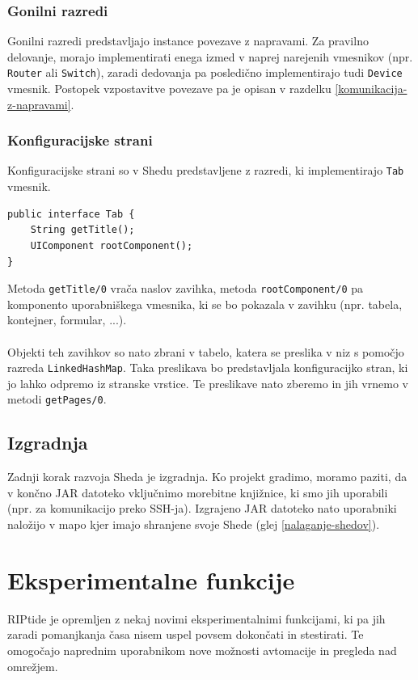 \documentclass[12pt]{article}
\begin{document}
\subsubsection{Gonilni razredi}
Gonilni razredi predstavljajo instance povezave z napravami. Za pravilno
delovanje, morajo implementirati enega izmed v naprej narejenih vmesnikov
(npr. \texttt{Router} ali \texttt{Switch}), zaradi dedovanja pa posledično
implementirajo tudi \texttt{Device} vmesnik. Postopek vzpostavitve povezave
pa je opisan v razdelku \ref{komunikacija-z-napravami}.

\subsubsection{Konfiguracijske strani} \label{konfiguracijske-strani}
Konfiguracijske strani so v Shedu predstavljene z razredi, ki
implementirajo \texttt{Tab} vmesnik.

\begin{lstlisting}[style=JavaStyle]
public interface Tab {
	String getTitle();
	UIComponent rootComponent();
}
\end{lstlisting}
Metoda \texttt{getTitle/0} vrača naslov zavihka, metoda
\texttt{rootComponent/0} pa komponento uporabniškega vmesnika, ki se bo
pokazala v zavihku (npr. tabela, kontejner, formular, ...).
\\\\
Objekti teh zavihkov so nato zbrani v tabelo, katera se preslika v niz s
pomočjo razreda \texttt{LinkedHashMap}. Taka preslikava bo predstavljala
konfiguracijko stran, ki jo lahko odpremo iz stranske vrstice. Te
preslikave nato zberemo in jih vrnemo v metodi \texttt{getPages/0}.

\subsection{Izgradnja}
Zadnji korak razvoja Sheda je izgradnja. Ko projekt gradimo, moramo paziti,
da v končno JAR datoteko vključnimo morebitne knjižnice, ki smo jih
uporabili (npr. za komunikacijo preko SSH-ja). Izgrajeno JAR datoteko nato
uporabniki naložijo v mapo kjer imajo shranjene svoje Shede
(glej \ref{nalaganje-shedov}).
\newpage

\section{Eksperimentalne funkcije}
RIPtide je opremljen z nekaj novimi eksperimentalnimi funkcijami,
ki pa jih zaradi pomanjkanja časa nisem uspel povsem dokončati in
stestirati. Te omogočajo naprednim uporabnikom nove možnosti avtomacije
in pregleda nad omrežjem.
\end{document}
